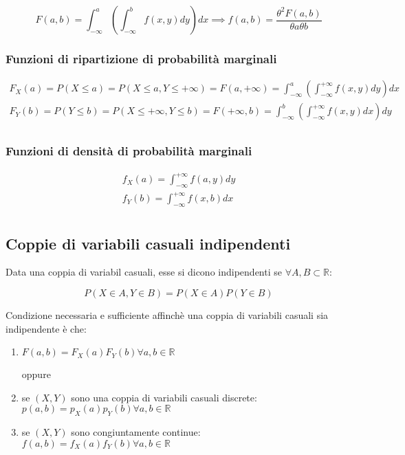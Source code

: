 \documentclass{subfiles}
\begin{document}
$$
F(a,b) = \int^a_{-\infty} (\int^b_{-\infty} f(x,y) dy) dx \implies f(a,b) = \frac{\theta^2 F(a,b)}{\theta a \theta b}
$$

\subsubsection{Funzioni di ripartizione di probabilità marginali}

$$
\begin{matrix}
F_X(a) = P(X \leq a) = P(X \leq a, Y\leq+\infty) = F(a,+\infty) = \int^a_{-\infty} (\int^{+\infty}_{-\infty} f(x,y) dy) dx \\
F_Y(b) = P(Y \leq b) = P(X\leq+\infty, Y \leq b) = F(+\infty,b) = \int^b_{-\infty} (\int^{+\infty}_{-\infty} f(x,y) dx) dy \\
\end{matrix}
$$

\subsubsection{Funzioni di densità di probabilità marginali}

$$
\begin{matrix}
f_X(a) = \int^{+\infty}_{-\infty} f(a,y) dy \\
f_Y(b) = \int^{+\infty}_{-\infty} f(x,b) dx \\
\end{matrix}
$$

\subsection{Coppie di variabili casuali indipendenti}

Data una coppia di variabil casuali, esse si dicono indipendenti se $\forall A,B \subset \mathbb{R}$:

$$
P(X \in A, Y \in B) = P(X \in A)P(Y \in B)
$$

\noindent
Condizione necessaria e sufficiente affinchè una coppia di variabili casuali sia indipendente è che:

\begin{enumerate}
    \item $F(a,b) = F_X(a)F_Y(b) \forall a,b \in \mathbb{R}$

    oppure

    \item se $(X,Y)$ sono una coppia di variabili casuali discrete: $p(a,b) = p_X(a)p_Y(b) \forall a,b \in \mathbb{R}$
    \item se $(X,Y)$ sono congiuntamente continue: $f(a,b) = f_X(a)f_Y(b) \forall a,b \in \mathbb{R}$
\end{enumerate}
\end{document}

